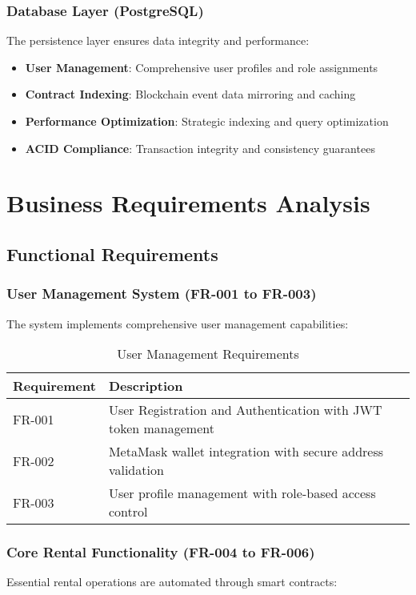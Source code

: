 \documentclass[12pt,a4paper]{article}
\begin{document}
\subsubsection{Database Layer (PostgreSQL)}
The persistence layer ensures data integrity and performance:
\begin{itemize}
    \item \textbf{User Management}: Comprehensive user profiles and role assignments
    \item \textbf{Contract Indexing}: Blockchain event data mirroring and caching
    \item \textbf{Performance Optimization}: Strategic indexing and query optimization
    \item \textbf{ACID Compliance}: Transaction integrity and consistency guarantees
\end{itemize}

\section{Business Requirements Analysis}

\subsection{Functional Requirements}

\subsubsection{User Management System (FR-001 to FR-003)}
The system implements comprehensive user management capabilities:

\begin{table}[H]
\centering
\begin{tabular}{|l|p{10cm}|}
\hline
\textbf{Requirement} & \textbf{Description} \\
\hline
FR-001 & User Registration and Authentication with JWT token management \\
FR-002 & MetaMask wallet integration with secure address validation \\
FR-003 & User profile management with role-based access control \\
\hline
\end{tabular}
\caption{User Management Requirements}
\end{table}

\subsubsection{Core Rental Functionality (FR-004 to FR-006)}
Essential rental operations are automated through smart contracts:
\end{document}
